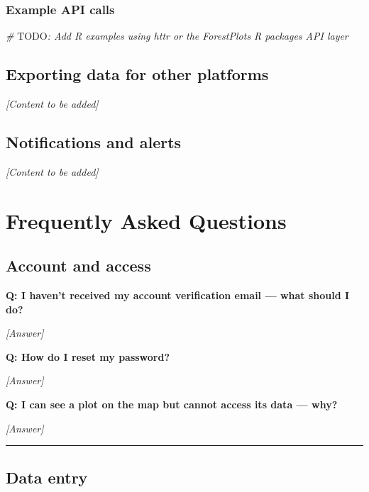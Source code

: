\documentclass[
]{book}
\newenvironment{Shaded}{\begin{snugshade}}{\end{snugshade}}
\newcommand{\AlertTok}[1]{\textcolor[rgb]{0.94,0.16,0.16}{#1}}
\newcommand{\CommentTok}[1]{\textcolor[rgb]{0.56,0.35,0.01}{\textit{#1}}}
\begin{document}
\subsection{Example API calls}\label{example-api-calls}

\begin{Shaded}
\begin{Highlighting}[]
\CommentTok{\# }\AlertTok{TODO}\CommentTok{: Add R examples using httr or the ForestPlots R package\textquotesingle{}s API layer}
\end{Highlighting}
\end{Shaded}

\section{Exporting data for other platforms}\label{exporting-data-for-other-platforms}

\emph{{[}Content to be added{]}}

\section{Notifications and alerts}\label{notifications-and-alerts}

\emph{{[}Content to be added{]}}

\chapter{Frequently Asked Questions}\label{faq}

\section{Account and access}\label{account-and-access}

\textbf{Q: I haven't received my account verification email --- what should I do?}

\emph{{[}Answer{]}}

\textbf{Q: How do I reset my password?}

\emph{{[}Answer{]}}

\textbf{Q: I can see a plot on the map but cannot access its data --- why?}

\emph{{[}Answer{]}}

\begin{center}\rule{0.5\linewidth}{0.5pt}\end{center}

\section{Data entry}\label{data-entry-1}
\end{document}
